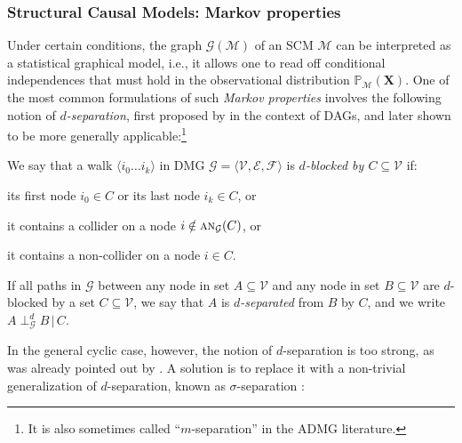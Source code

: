 \documentclass[twoside,11pt]{article}
\DeclareMathOperator*{\SEP}{\perp}
\newcommand{\dsep}[4]{{#1} \SEP_{#4}^d {#2} \given {#3}}
\newcommand{\Prb}{\mathbb{P}}
\newcommand\B[1]{\bm{#1}}
\newcommand\C[1]{\mathcal{#1}}
\newcommand\mathbfsc[1]{\text{\normalfont\scshape#1}}
\newcommand\ansub[2]{\mathbfsc{an}_{#1}(#2)}
\newcommand\given{\,|\,}
\begin{document}
\subsubsection{Structural Causal Models: Markov properties}\label{sec:markov}
Under certain conditions, the graph $\C{G}(\C{M})$ of an SCM $\C{M}$ can be interpreted as a statistical
graphical model, i.e., it allows one to read off
conditional independences that must hold in the observational distribution $\Prb_{\C{M}}(\B{X})$.
One of the most common formulations of such \emph{Markov properties} involves the following notion of \emph{$d$-separation},
first proposed by \citet{Pearl1986} in the context of DAGs,
and later shown to be more generally applicable:\footnote{It is also sometimes called ``$m$-separation'' in the ADMG literature.}
\begin{definition}[$d$-separation]
We say that a walk $\langle i_0 \dots i_k \rangle$ in DMG $\C{G} = \langle \C{V},\C{E},\C{F} \rangle$ is \emph{$d$-blocked by $C \subseteq \C{V}$} if:
\begin{compactenum}[(i)]
  \item its first node $i_0 \in C$ or its last node $i_k \in C$, or
  \item it contains a collider on a node $i \notin \ansub{\C{G}}{C}$, or
  \item it contains a non-collider on a node $i \in C$.
\end{compactenum}
If all paths in $\C{G}$ between any node in set $A \subseteq \C{V}$ and any node in set $B \subseteq \C{V}$
are $d$-blocked by a set $C \subseteq \C{V}$, we say that $A$ is \emph{$d$-separated}
from $B$ by $C$, and we write $\dsep{A}{B}{C}{\C{G}}$.
\end{definition}
In the general cyclic case, however, the notion of $d$-separation is too strong, as was already pointed out by
\citet{Spirtes94}. A solution is to replace it with a non-trivial generalization of $d$-separation, 
known as $\sigma$-separation \citep{ForreMooij_1710.08775}:
\end{document}
